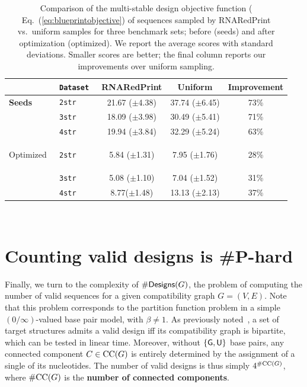 \documentclass{bioinfo}
\newcommand{\real}{\mathbb{R}}
\newcommand{\Def}[1]{{\bfseries #1}}
\newcommand{\NumDesign}{\ensuremath{\#}{\sf Designs}\xspace}
\newcommand{\Nuc}[1]{{\sf #1}}
\newcommand{\Gb}{\Nuc{G}}
\newcommand{\Ub}{\Nuc{U}}
\newcommand{\Software}[1]{{\ttfamily #1}}
\newcommand{\ourprog}{\Software{RNARedPrint}}
\begin{document}
\begin{table}[t]
\centering
\medskip
\begin{tabular}{@{}>{\bf}l@{\quad}>{\tt}l@{\quad}@{\quad}c@{\quad}c@{\quad}c@{}}
             &   \textbf{\textrm{Dataset}}   & {\bfseries\ourprog{}} & \textbf{Uniform} & \textbf{Improvement} \\\toprule
  Seeds      & 2str & 21.67 ($\pm$4.38) & 37.74 ($\pm$6.45) & 73\%\\
             & 3str & 18.09 ($\pm$3.98) & 30.49 ($\pm$5.41) & 71\%\\
             & 4str & 19.94 ($\pm$3.84) & 32.29 ($\pm$5.24) & 63\%\\\midrule

  Optimized  & 2str & 5.84 ($\pm$1.31) & 7.95 ($\pm$1.76) & 28\%\\
             & 3str & 5.08 ($\pm$1.10) & 7.04 ($\pm$1.52) & 31\%\\
             & 4str & 8.77($\pm$1.48) & 13.13 ($\pm$2.13) & 37\% \\ \bottomrule
\end{tabular}\\[1em]

\caption{Comparison of the multi-stable design objective function (
  Eq.~(\ref{eq:blueprintobjective}) of sequences sampled by \ourprog{}
  vs.\ uniform samples for three benchmark sets; before (seeds) and
  after optimization (optimized). We report the average scores with
  standard deviations. Smaller scores are better; the final column
  reports our improvements over uniform sampling.}
\label{tab:benchmark-results}
\end{table}

\section{Counting valid designs is \#{\sf P}-hard}\label{sec:counting}

Finally, we turn to the complexity of $\NumDesign(G)$, the problem of computing the number of valid sequences for a given compatibility graph $G=(V,E)$. Note that this problem corresponds to the partition function problem in a simple $(0/\infty)$-valued base pair model, with $\beta\neq 1$. As previously noted~\citep{Flamm2001}, a set of target structures admits a valid design iff its compatibility graph is bipartite, which can be tested in linear time.
Moreover, without $\{\Gb, \Ub\}$ base pairs, any connected component  $C\in {\rm CC}(G)$ is entirely determined by the assignment of a single of its nucleotides. The number of valid designs is thus simply $4^{\#{\rm CC}(G)}$, where $\#{\rm CC}(G)$ is the \Def{number of connected components}.
\end{document}
